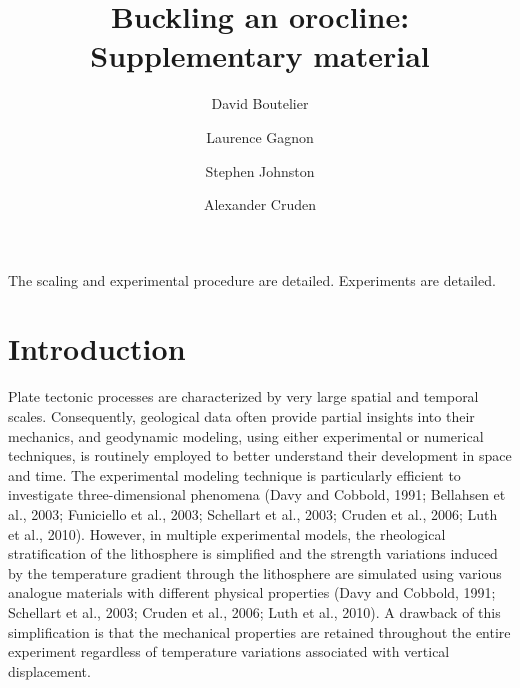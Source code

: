 \documentclass[11pt]{article}
\renewenvironment{abstract}
  {{\bfseries\noindent{\abstractname}\par\nobreak}\footnotesize}
  {\bigskip}
\begin{document}
\title{Buckling an orocline: Supplementary material}

\author[1]{David Boutelier}%
\author[2]{Laurence Gagnon}
\author[3]{Stephen Johnston}
\author[4]{Alexander Cruden}

%
%
%
%

\date{}
\vspace{-1em}

\begingroup
\let\center\flushleft
\let\endcenter\endflushleft
\maketitle
\endgroup





\begin{abstract}
The scaling and experimental procedure are detailed. Experiments are detailed.
\end{abstract}%


\section*{Introduction}
Plate tectonic processes are characterized by very large spatial and temporal scales. Consequently, geological data often provide partial insights into their mechanics, and geodynamic modeling, using either experimental or numerical techniques, is routinely employed to better understand their development in space and time. The experimental modeling technique is particularly efficient to investigate three-dimensional phenomena (Davy and Cobbold, 1991; Bellahsen et al., 2003; Funiciello et al., 2003; Schellart et al., 2003; Cruden et al., 2006; Luth et al., 2010). However, in multiple experimental models, the rheological stratification of the lithosphere is simplified and the strength variations induced by the temperature gradient through the lithosphere are simulated using various analogue materials with different physical properties (Davy and Cobbold, 1991; Schellart et al., 2003; Cruden et al., 2006; Luth et al., 2010). A drawback of this simplification is that the mechanical properties are retained throughout the entire experiment regardless of temperature variations associated with vertical displacement.
\end{document}
